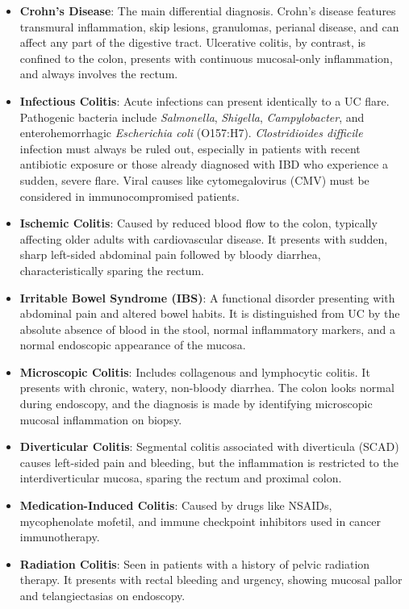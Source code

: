 \begin{itemize}
  \item \textbf{Crohn's Disease}: The main differential diagnosis. Crohn's disease features transmural inflammation, skip lesions, granulomas, perianal disease, and can affect any part of the digestive tract. Ulcerative colitis, by contrast, is confined to the colon, presents with continuous mucosal-only inflammation, and always involves the rectum.
  \item \textbf{Infectious Colitis}: Acute infections can present identically to a UC flare. Pathogenic bacteria include \textit{Salmonella}, \textit{Shigella}, \textit{Campylobacter}, and enterohemorrhagic \textit{Escherichia coli} (O157:H7). \textit{Clostridioides difficile} infection must always be ruled out, especially in patients with recent antibiotic exposure or those already diagnosed with IBD who experience a sudden, severe flare. Viral causes like cytomegalovirus (CMV) must be considered in immunocompromised patients.
  \item \textbf{Ischemic Colitis}: Caused by reduced blood flow to the colon, typically affecting older adults with cardiovascular disease. It presents with sudden, sharp left-sided abdominal pain followed by bloody diarrhea, characteristically sparing the rectum.
  \item \textbf{Irritable Bowel Syndrome (IBS)}: A functional disorder presenting with abdominal pain and altered bowel habits. It is distinguished from UC by the absolute absence of blood in the stool, normal inflammatory markers, and a normal endoscopic appearance of the mucosa.
  \item \textbf{Microscopic Colitis}: Includes collagenous and lymphocytic colitis. It presents with chronic, watery, non-bloody diarrhea. The colon looks normal during endoscopy, and the diagnosis is made by identifying microscopic mucosal inflammation on biopsy.
  \item \textbf{Diverticular Colitis}: Segmental colitis associated with diverticula (SCAD) causes left-sided pain and bleeding, but the inflammation is restricted to the interdiverticular mucosa, sparing the rectum and proximal colon.
  \item \textbf{Medication-Induced Colitis}: Caused by drugs like NSAIDs, mycophenolate mofetil, and immune checkpoint inhibitors used in cancer immunotherapy.
  \item \textbf{Radiation Colitis}: Seen in patients with a history of pelvic radiation therapy. It presents with rectal bleeding and urgency, showing mucosal pallor and telangiectasias on endoscopy.
\end{itemize}

